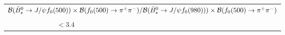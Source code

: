 \begin{center}
\begin{longtable}{| l l l |}
\hline
\multicolumn{3}{|l|}{${{\cal{B}} ( \bar{B}^0_s \to J/\psi f_0(500) ) \times {\cal{B}} ( f_0(500) \to \pi^+ \pi^- )}/  { {\cal{B}} ( \bar{B}^0_s \to J/\psi f_0(980)  )) \times {\cal{B}} ( f_0(500)  \to \pi^+ \pi^- )}$}\\
 & \begin{tabular}{l} LHCb \cite{Aaij:2014emv}: $< 3.4$ \\ \end{tabular} & $< 3.4$ \\
\hline
\end{longtable}
\end{center}
